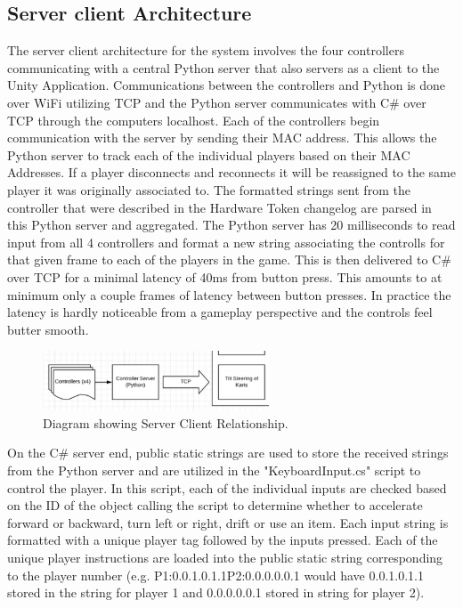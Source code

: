 \documentclass[a4paper,10pt]{article}
\begin{document}
\subsection{Server client Architecture}
The server client architecture for the system involves the four controllers communicating with a central Python server that also servers as a client to the Unity Application. Communications between the controllers and Python is done over WiFi utilizing TCP and the Python server communicates with C\# over TCP through the computers localhost. Each of the controllers begin communication with the server by sending their MAC address. This allows the Python server to track each of the individual players based on their MAC Addresses. If a player disconnects and reconnects it will be reassigned to the same player it was originally associated to. The formatted strings sent from the controller that were described in the Hardware Token changelog are parsed in this Python server and aggregated. The Python server has 20 milliseconds to read input from all 4 controllers and format a new string associating the controlls for that given frame to each of the players in the game. This is then delivered to C\# over TCP for a minimal latency of 40ms from button press. This amounts to at minimum only a couple frames of latency between button presses. In practice the latency is hardly noticeable from a gameplay perspective and the controls feel butter smooth.

\begin{figure}[H]
  \centering
      \includegraphics[width=0.6\textwidth]{Assets/TCP.png}
  \caption{Diagram showing Server Client Relationship.}
\end{figure}

On the C\# server end, public static strings are used to store the received strings from the Python server and are utilized in the "KeyboardInput.cs" script to control the player. In this script, each of the individual inputs are checked based on the ID of the object calling the script to determine whether to accelerate forward or backward, turn left or right, drift or use an item. Each input string is formatted with a unique player tag followed by the inputs pressed. Each of the unique player instructions are loaded into the public static string corresponding to the player number (e.g. P1:0.0.1.0.1.1P2:0.0.0.0.0.1 would have 0.0.1.0.1.1 stored in the string for player 1 and 0.0.0.0.0.1 stored in string for player 2).
\end{document}
